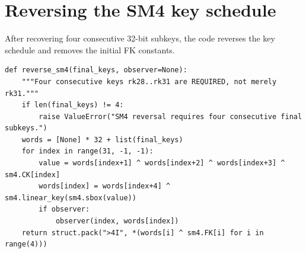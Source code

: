 \documentclass[11pt,a4paper]{report}
\begin{document}
\section{Reversing the SM4 key schedule}
After recovering four consecutive 32-bit subkeys, the code reverses the key schedule and removes the initial FK constants.
\begin{lstlisting}[style=pycode,caption={Reverse SM4 key expansion, from piret.py}]
def reverse_sm4(final_keys, observer=None):
    """Four consecutive keys rk28..rk31 are REQUIRED, not merely rk31."""
    if len(final_keys) != 4:
        raise ValueError("SM4 reversal requires four consecutive final subkeys.")
    words = [None] * 32 + list(final_keys)
    for index in range(31, -1, -1):
        value = words[index+1] ^ words[index+2] ^ words[index+3] ^ sm4.CK[index]
        words[index] = words[index+4] ^ sm4.linear_key(sm4.sbox(value))
        if observer:
            observer(index, words[index])
    return struct.pack(">4I", *(words[i] ^ sm4.FK[i] for i in range(4)))
\end{lstlisting}
\end{document}

